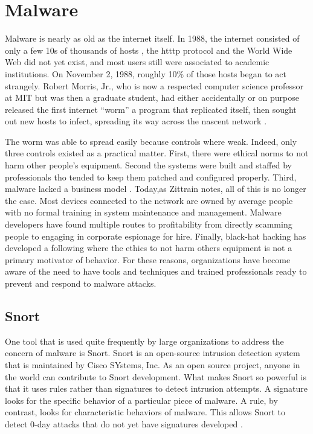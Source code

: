 \section{Malware}

Malware is nearly as old as the internet itself. In 1988, the internet consisted of only a few 10s of thousands of hosts \parencite{zimmermannInternetHistoryTimeline2016}, the htttp protocol and the World Wide Web did not yet exist, and most users still were associated to academic institutions. On November 2, 1988, roughly 10\% of those hosts began to act strangely. Robert Morris, Jr., who is now a respected computer science professor at MIT but was then a graduate student, had either accidentally or on purpose released the first internet ``worm'' a program that replicated itself, then sought out new hosts to infect, spreading its way across the nascent network \parencite{zittrainProtectingInternetWrecking2008}.

The worm was able to spread easily because controls where weak. Indeed, only three controls existed as a practical matter. First, there were ethical norms to not harm other people's equipment. Second the systems were built and staffed by professionals tho tended to keep them patched and configured properly. Third, malware lacked a business model \parencite{zittrainProtectingInternetWrecking2008}. Today,as Zittrain notes, all of this is no longer the case. Most devices connected to the network are owned by average people with no formal training in system maintenance and management. Malware developers have found multiple routes to profitability from directly scamming people to engaging in corporate espionage for hire. Finally, black-hat hacking has developed a following where the ethics to not harm others equipment is not a primary motivator of behavior. For these reasons, organizations have become aware of the need to have tools and techniques and trained professionals ready to prevent and respond to malware attacks.

\subsection{Snort}

One tool that is used quite frequently by large organizations to address the concern of malware is Snort. Snort is an open-source intrusion detection system that is maintained by Cisco SYstems, Inc. As an open source project, anyone in the world can contribute to Snort development. What makes Snort so powerful is that it uses rules rather than signatures to detect intrusion attempts. A signature looks for the specific behavior of a particular piece of malware. A rule, by contrast, looks for characteristic behaviors of malware. This allows Snort to detect 0-day attacks that do not yet have signatures developed \parencite{ciscoSnortNetworkIntrusion2021}.

